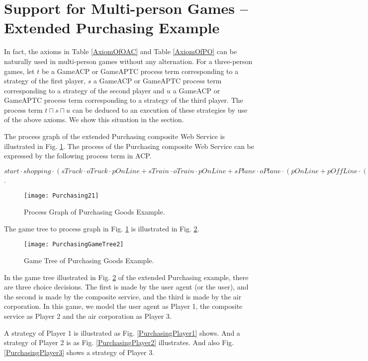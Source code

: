 \documentclass{fac}
\begin{document}
\section{Support for Multi-person Games -- Extended Purchasing Example}

In fact, the axioms in Table \ref{AxiomOfOAC} and Table \ref{AxiomOfPO} can be naturally used in multi-person games without any alternation. For a three-person games, let $t$ be a GameACP or GameAPTC process term corresponding to a strategy of the first player, $s$ a GameACP or GameAPTC process term corresponding to a strategy of the second player and $u$ a GameACP or GameAPTC process term corresponding to a strategy of the third player. The process term $t\sqcap s\sqcap u$ can be deduced to an execution of these strategies by use of the above axioms. We show this situation in the section.

The process graph of the extended Purchasing composite Web Service is illustrated in Fig. \ref{Purchasing21}. The process of the Purchasing composite Web Service can be expressed by the following process term in ACP.

$start\cdot shopping\cdot (sTruck\cdot oTruck\cdot pOnLine + sTrain\cdot oTrain\cdot pOnLine + sPlane \cdot oPlane \cdot (pOnLine + pOffLine \cdot (ByCheck + ByBank)))$.

\begin{figure}
  \centering
\texttt{[image: Purchasing21]}
  \caption{Process Graph of Purchasing Goods Example.}
  \label{Purchasing21}
\end{figure}

The game tree to process graph in Fig. \ref{Purchasing21} is illustrated in Fig. \ref{PurchasingGameTree2}.

\begin{figure}
  \centering
\texttt{[image: PurchasingGameTree2]}
  \caption{Game Tree of Purchasing Goods Example.}
  \label{PurchasingGameTree2}
\end{figure}

In the game tree illustrated in Fig. \ref{PurchasingGameTree2} of the extended Purchasing example, there are three choice decisions. The first is made by the user agent (or the user), and the second is made by the composite service, and the third is made by the air corporation. In this game, we model the user agent as Player 1, the composite service as Player 2 and the air corporation as Player 3.

A strategy of Player 1 is illustrated as Fig. \ref{PurchasingPlayer1} shows. And a strategy of Player 2 is as Fig. \ref{PurchasingPlayer2} illustrates. And also Fig. \ref{PurchasingPlayer3} shows a strategy of Player 3.
\end{document}
